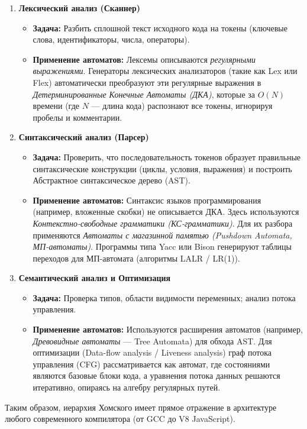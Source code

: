 \documentclass[12pt,a4paper]{article}
\theoremstyle{definition}
\theoremstyle{plain}
\theoremstyle{remark}
\begin{document}
\begin{enumerate}
    \item \textbf{Лексический анализ (Сканнер)}
    \begin{itemize}
        \item \textbf{Задача:} Разбить сплошной текст исходного кода на токены (ключевые слова, идентификаторы, числа, операторы).
        \item \textbf{Применение автоматов:} Лексемы описываются \textit{регулярными выражениями}. Генераторы лексических анализаторов (такие как Lex или Flex) автоматически преобразуют эти регулярные выражения в \textit{Детерминированные Конечные Автоматы (ДКА)}, которые за $O(N)$ времени (где $N$ — длина кода) распознают все токены, игнорируя пробелы и комментарии.
    \end{itemize}

    \item \textbf{Синтаксический анализ (Парсер)}
    \begin{itemize}
        \item \textbf{Задача:} Проверить, что последовательность токенов образует правильные синтаксические конструкции (циклы, условия, выражения) и построить Абстрактное синтаксическое дерево (AST).
        \item \textbf{Применение автоматов:} Синтаксис языков программирования (например, вложенные скобки) не описывается ДКА. Здесь используются \textit{Контекстно-свободные грамматики (КС-грамматики)}. Для их разбора применяются \textit{Автоматы с магазинной памятью (Pushdown Automata, МП-автоматы)}. Программы типа Yacc или Bison генерируют таблицы переходов для МП-автомата (алгоритмы LALR / LR(1)).
    \end{itemize}

    \item \textbf{Семантический анализ и Оптимизация}
    \begin{itemize}
        \item \textbf{Задача:} Проверка типов, области видимости переменных; анализ потока управления.
        \item \textbf{Применение автоматов:} Используются расширения автоматов (например, \textit{Древовидные автоматы} — Tree Automata) для обхода AST. Для оптимизации (Data-flow analysis / Liveness analysis) граф потока управления (CFG) рассматривается как автомат, где состояниями являются базовые блоки кода, а уравнения потока данных решаются итеративно, опираясь на алгебру регулярных путей.
    \end{itemize}
\end{enumerate}

Таким образом, иерархия Хомского имеет прямое отражение в архитектуре любого современного компилятора (от GCC до V8 JavaScript).
\end{document}
